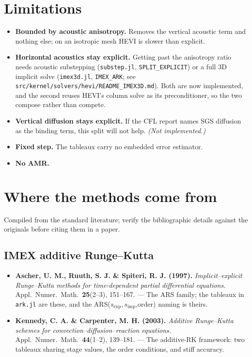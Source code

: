 \documentclass[11pt,a4paper]{article}
\begin{document}
\section{Limitations}
\begin{itemize}
\item \textbf{Bounded by acoustic anisotropy.} Removes the vertical acoustic
      term and nothing else; on an isotropic mesh HEVI is slower than explicit.
\item \textbf{Horizontal acoustics stay explicit.} Getting past the anisotropy
      ratio needs acoustic substepping (\texttt{substep.jl},
      \texttt{SPLIT\_EXPLICIT}) or a full 3D implicit solve
      (\texttt{imex3d.jl}, \texttt{IMEX\_ARK}; see
      \texttt{src/kernel/solvers/hevi/README\_IMEX3D.md}). Both are now
      implemented, and the second reuses HEVI's column solve as its
      preconditioner, so the two compose rather than compete.
\item \textbf{Vertical diffusion stays explicit.} If the CFL report names SGS
      diffusion as the binding term, this split will not help.
      \emph{(Not implemented.)}
\item \textbf{Fixed step.} The tableaux carry no embedded error estimator.
\item \textbf{No AMR.}
\end{itemize}


\section{Where the methods come from}
Compiled from the standard literature; verify the bibliographic details against
the originals before citing them in a paper.

\subsection{IMEX additive Runge--Kutta}
\begin{itemize}
\item \textbf{Ascher, U. M., Ruuth, S. J. \& Spiteri, R. J. (1997).}
  \emph{Implicit--explicit Runge--Kutta methods for time-dependent partial
  differential equations.} Appl.\ Numer.\ Math.\ \textbf{25}(2--3), 151--167.
  --- The ARS family; the tableaux in \texttt{ark.jl} are these, and the
  ARS($s_{\mathrm{exp}},s_{\mathrm{imp}}$,order) naming is theirs.
\item \textbf{Kennedy, C. A. \& Carpenter, M. H. (2003).} \emph{Additive
  Runge--Kutta schemes for convection--diffusion--reaction equations.}
  Appl.\ Numer.\ Math.\ \textbf{44}(1--2), 139--181.
  --- The additive-RK framework: two tableaux sharing stage values, the order
  conditions, and stiff accuracy.
\end{itemize}
\end{document}
